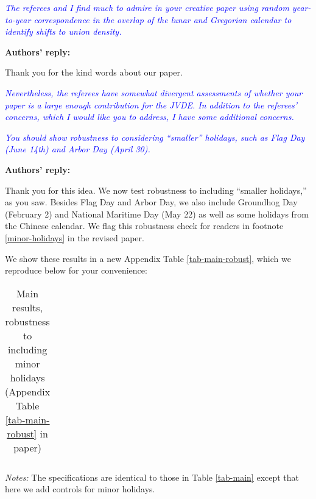 \documentclass[12pt]{article}
\begin{document}
\begin{refsection}
\textcolor{blue}{\textit{The referees and I find much to admire in your creative paper using random year-to-year correspondence in the overlap of the lunar and Gregorian calendar to identify shifts to union density.}}

\vspace{.5cm}
\textbf{Authors' reply:} 

Thank you for the kind words about our paper.
\smallskip

\textcolor{blue}{\textit{Nevertheless, the referees have somewhat divergent assessments of whether your paper is a large enough contribution for the JVDE.
In addition to the referees' concerns, which I would like you to address, I have some additional concerns.}}

\textcolor{blue}{\textit{You should show robustness to considering ``smaller'' holidays, such as Flag Day (June 14th) and Arbor Day (April 30).}}

\medskip

\vspace{.5cm}
\textbf{Authors' reply:} 

Thank you for this idea.  We now test robustness to including ``smaller holidays,'' as you saw.  Besides Flag Day and Arbor Day, we also include Groundhog Day (February 2) and National Maritime Day (May 22) as well as some holidays from the Chinese calendar.  We flag this robustness check for readers in footnote \ref{minor-holidays} in the revised paper.


We show these results in a new Appendix Table \ref{tab-main-robust}, which we reproduce below for your convenience:

\begin{table}[h]
\setlength{\tabcolsep}{1pt}
\def\sym#1{\ifmmode^{#1}\else\(^{#1}\)\fi}
\caption{Main results, robustness to including minor holidays (Appendix Table \ref{tab-main-robust} in paper)}
\scriptsize{
\begin{tabular*}{1.0\hsize}{@{\hskip\tabcolsep\extracolsep\fill}l  cc cc cc cc   }
\toprule

\bottomrule
\end{tabular*}
}
\raggedright
\footnotesize{\textit{Notes:} The specifications are identical to those in Table \ref{tab-main} except that here we add controls for minor holidays.}
\end{table}


\end{refsection}
\end{document}
